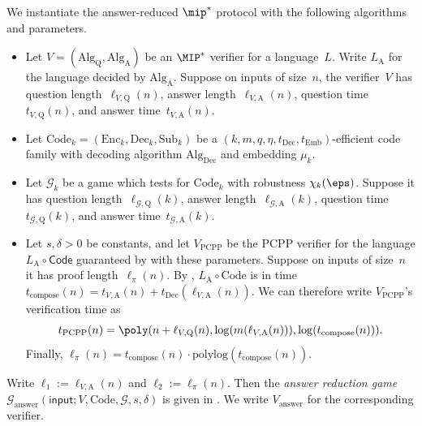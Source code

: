 \documentclass[11pt]{article}
\newcommand{\codec}{\mathrm{Code}}
\newcommand{\codee}{\mathrm{Enc}}
\newcommand{\coded}{\mathrm{Dec}}
\newcommand{\codes}{\mathrm{Sub}}
\newcommand{\game}{\mathscr{G}}
\begin{document}
\begin{definition}\label{def:answer-reduction-game}
We instantiate the answer-reduced $\mip^*$ protocol with the following algorithms and parameters.
\begin{itemize}
\item[$\circ$] Let $V = (\mathrm{Alg}_{\mathrm{Q}}, \mathrm{Alg}_{\mathrm{A}})$ be an $\MIP^*$ verifier for a language~$L$.
		Write $L_{\mathrm{A}}$ for the language decided by $\mathrm{Alg}_{\mathrm{A}}$.
		Suppose on inputs of size~$n$, the verifier~$V$ has question length~$\ell_{V,\mathrm{Q}}(n)$, answer length~$\ell_{V,\mathrm{A}}(n)$,
		question time~$t_{V,\mathrm{Q}}(n)$, and answer time~$t_{V,\mathrm{A}}(n)$.
\item[$\circ$] Let $\codec_k = (\codee_k,\coded_k, \codes_k)$ be a $(k, m, q, \eta, t_{\mathrm{Dec}}, t_{\mathrm{Emb}})$-efficient code family
		with decoding algorithm $\mathrm{Alg}_{\mathrm{Dec}}$ and embedding $\mu_k$.
\item[$\circ$] Let $\game_k$ be a game which tests for $\codec_k$ with robustness $\chi_k(\eps)$.
		Suppose it has question length~$\ell_{\game, \mathrm{Q}}(k)$, answer length~$\ell_{\game,\mathrm{A}}(k)$,
		question time~$t_{\game,\mathrm{Q}}(k)$, and answer time~$t_{\game,\mathrm{A}}(k)$.
\item[$\circ$] Let $s, \delta > 0$ be constants, and let $V_{\mathrm{PCPP}}$ be the PCPP verifier for the language $L_{\mathrm{A}} \circ \mathsf{Code}$
			guaranteed by  with these parameters.
			Suppose on inputs of size~$n$ it has proof length~$\ell_\pi(n)$.
			By , $L_{\mathrm{A}} \circ \codec$ is in time
			$t_{\mathrm{compose}}(n) = t_{V, \mathrm{A}}(n) + t_{\mathrm{Dec}}(\ell_{V,\mathrm{A}}(n))$.
			We can therefore write $V_{\mathrm{PCPP}}$'s verification time as
			\begin{equation*}
				t_{\mathrm{PCPP}}(n) = \poly(n + \ell_{V, \mathrm{Q}}(n), \log(m(\ell_{V, \mathrm{A}}(n))), \log(t_{\mathrm{compose}}(n))).
			\end{equation*}
			Finally, $\ell_\pi(n) = t_{\mathrm{compose}}(n) \cdot \mathrm{poly log}(t_{\mathrm{compose}}(n))$.
\end{itemize}
Write $\ell_1 := \ell_{V, \mathrm{A}}(n)$ and $\ell_2 := \ell_\pi(n)$.
Then the \emph{answer reduction game} $\game_{\mathrm{answer}}(\mathsf{input};V, \codec, \game, s, \delta)$
is given in .
We write $V_{\mathrm{answer}}$ for the corresponding verifier.
\end{definition}
\end{document}
